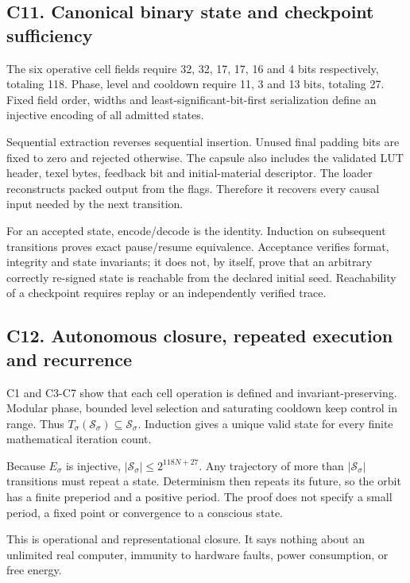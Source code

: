 \documentclass[11pt,a4paper]{article}
\begin{document}
\subsection{C11. Canonical binary state and checkpoint
sufficiency}\label{c11.-canonical-binary-state-and-checkpoint-sufficiency}

The six operative cell fields require 32, 32, 17, 17, 16 and 4 bits
respectively, totaling 118. Phase, level and cooldown require 11, 3 and
13 bits, totaling 27. Fixed field order, widths and
least-significant-bit-first serialization define an injective encoding
of all admitted states.

Sequential extraction reverses sequential insertion. Unused final
padding bits are fixed to zero and rejected otherwise. The capsule also
includes the validated LUT header, texel bytes, feedback bit and
initial-material descriptor. The loader reconstructs packed output from
the flags. Therefore it recovers every causal input needed by the next
transition.

For an accepted state, encode/decode is the identity. Induction on
subsequent transitions proves exact pause/resume equivalence. Acceptance
verifies format, integrity and state invariants; it does not, by itself,
prove that an arbitrary correctly re-signed state is reachable from the
declared initial seed. Reachability of a checkpoint requires replay or
an independently verified trace.

\subsection{C12. Autonomous closure, repeated execution and
recurrence}\label{c12.-autonomous-closure-repeated-execution-and-recurrence}

C1 and C3-C7 show that each cell operation is defined and
invariant-preserving. Modular phase, bounded level selection and
saturating cooldown keep control in range. Thus
\(T_\sigma(\mathcal S_\sigma)\subseteq\mathcal S_\sigma\). Induction
gives a unique valid state for every finite mathematical iteration
count.

Because \(E_\sigma\) is injective,
\(|\mathcal S_\sigma|\le2^{118N+27}\). Any trajectory of more than
\(|\mathcal S_\sigma|\) transitions must repeat a state. Determinism
then repeats its future, so the orbit has a finite preperiod and a
positive period. The proof does not specify a small period, a fixed
point or convergence to a conscious state.

This is operational and representational closure. It says nothing about
an unlimited real computer, immunity to hardware faults, power
consumption, or free energy.
\end{document}
